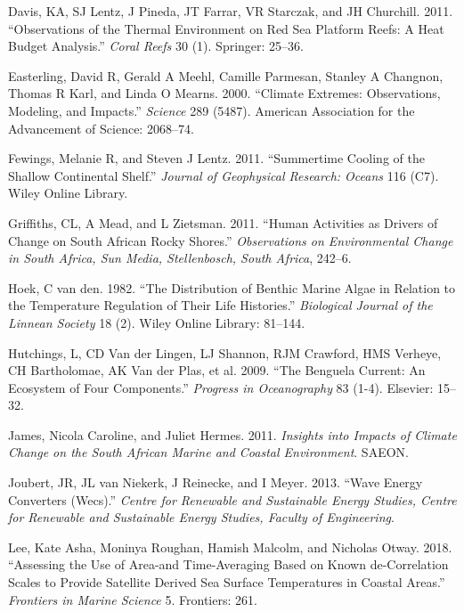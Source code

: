 \documentclass[12pt,A4paper,]{article}
\begin{document}
\hypertarget{ref-Davis2011}{}
Davis, KA, SJ Lentz, J Pineda, JT Farrar, VR Starczak, and JH Churchill.
2011. ``Observations of the Thermal Environment on Red Sea Platform
Reefs: A Heat Budget Analysis.'' \emph{Coral Reefs} 30 (1). Springer:
25--36.

\hypertarget{ref-Easterling2000}{}
Easterling, David R, Gerald A Meehl, Camille Parmesan, Stanley A
Changnon, Thomas R Karl, and Linda O Mearns. 2000. ``Climate Extremes:
Observations, Modeling, and Impacts.'' \emph{Science} 289 (5487).
American Association for the Advancement of Science: 2068--74.

\hypertarget{ref-Fewings2011}{}
Fewings, Melanie R, and Steven J Lentz. 2011. ``Summertime Cooling of
the Shallow Continental Shelf.'' \emph{Journal of Geophysical Research:
Oceans} 116 (C7). Wiley Online Library.

\hypertarget{ref-Griffiths2011}{}
Griffiths, CL, A Mead, and L Zietsman. 2011. ``Human Activities as
Drivers of Change on South African Rocky Shores.'' \emph{Observations on
Environmental Change in South Africa, Sun Media, Stellenbosch, South
Africa}, 242--6.

\hypertarget{ref-Hoek1982}{}
Hoek, C van den. 1982. ``The Distribution of Benthic Marine Algae in
Relation to the Temperature Regulation of Their Life Histories.''
\emph{Biological Journal of the Linnean Society} 18 (2). Wiley Online
Library: 81--144.

\hypertarget{ref-Hutchings2009}{}
Hutchings, L, CD Van der Lingen, LJ Shannon, RJM Crawford, HMS Verheye,
CH Bartholomae, AK Van der Plas, et al. 2009. ``The Benguela Current: An
Ecosystem of Four Components.'' \emph{Progress in Oceanography} 83
(1-4). Elsevier: 15--32.

\hypertarget{ref-James2011}{}
James, Nicola Caroline, and Juliet Hermes. 2011. \emph{Insights into
Impacts of Climate Change on the South African Marine and Coastal
Environment}. SAEON.

\hypertarget{ref-Joubert2013}{}
Joubert, JR, JL van Niekerk, J Reinecke, and I Meyer. 2013. ``Wave
Energy Converters (Wecs).'' \emph{Centre for Renewable and Sustainable
Energy Studies, Centre for Renewable and Sustainable Energy Studies,
Faculty of Engineering}.

\hypertarget{ref-Lee2018}{}
Lee, Kate Asha, Moninya Roughan, Hamish Malcolm, and Nicholas Otway.
2018. ``Assessing the Use of Area-and Time-Averaging Based on Known
de-Correlation Scales to Provide Satellite Derived Sea Surface
Temperatures in Coastal Areas.'' \emph{Frontiers in Marine Science} 5.
Frontiers: 261.
\end{document}
